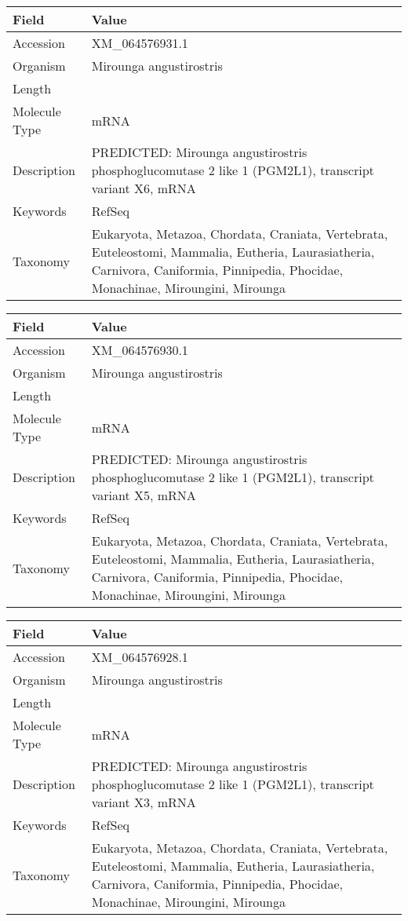 \documentclass[10pt]{article}
\begin{document}
{\footnotesize
\begin{longtable}{>{\raggedright\arraybackslash}p{4.5cm} >{\raggedright\arraybackslash}p{11.5cm}}
\textbf{Field} & \textbf{Value} \\
\hline
Accession & XM\_064576931.1 \\
Organism & Mirounga angustirostris \\
Length & 8156 \\
Molecule Type & mRNA \\
Description & PREDICTED: Mirounga angustirostris phosphoglucomutase 2 like 1 (PGM2L1), transcript variant X6, mRNA \\
Keywords & RefSeq \\
Taxonomy & Eukaryota, Metazoa, Chordata, Craniata, Vertebrata, Euteleostomi, Mammalia, Eutheria, Laurasiatheria, Carnivora, Caniformia, Pinnipedia, Phocidae, Monachinae, Miroungini, Mirounga \\
\end{longtable}
}

{\footnotesize
\begin{longtable}{>{\raggedright\arraybackslash}p{4.5cm} >{\raggedright\arraybackslash}p{11.5cm}}
\textbf{Field} & \textbf{Value} \\
\hline
Accession & XM\_064576930.1 \\
Organism & Mirounga angustirostris \\
Length & 7932 \\
Molecule Type & mRNA \\
Description & PREDICTED: Mirounga angustirostris phosphoglucomutase 2 like 1 (PGM2L1), transcript variant X5, mRNA \\
Keywords & RefSeq \\
Taxonomy & Eukaryota, Metazoa, Chordata, Craniata, Vertebrata, Euteleostomi, Mammalia, Eutheria, Laurasiatheria, Carnivora, Caniformia, Pinnipedia, Phocidae, Monachinae, Miroungini, Mirounga \\
\end{longtable}
}

{\footnotesize
\begin{longtable}{>{\raggedright\arraybackslash}p{4.5cm} >{\raggedright\arraybackslash}p{11.5cm}}
\textbf{Field} & \textbf{Value} \\
\hline
Accession & XM\_064576928.1 \\
Organism & Mirounga angustirostris \\
Length & 8015 \\
Molecule Type & mRNA \\
Description & PREDICTED: Mirounga angustirostris phosphoglucomutase 2 like 1 (PGM2L1), transcript variant X3, mRNA \\
Keywords & RefSeq \\
Taxonomy & Eukaryota, Metazoa, Chordata, Craniata, Vertebrata, Euteleostomi, Mammalia, Eutheria, Laurasiatheria, Carnivora, Caniformia, Pinnipedia, Phocidae, Monachinae, Miroungini, Mirounga \\
\end{longtable}
}
\end{document}
